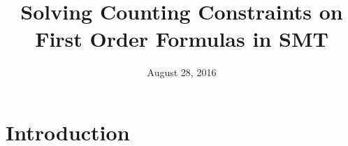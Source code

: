 \documentclass[]{article}
\title{Solving Counting Constraints on First Order Formulas in SMT}
\date{August 28, 2016}
\begin{document}
\maketitle

{
\setcounter{tocdepth}{3}
\tableofcontents
}

\newtheorem{definition}{Definition} \newtheorem{lemma}{Lemma}
\newtheorem{theorem}{Theorem} \newtheorem{property}{Property}
\newtheorem{example}{Example}

\section*{Introduction}\label{introduction}






%
\end{document}

